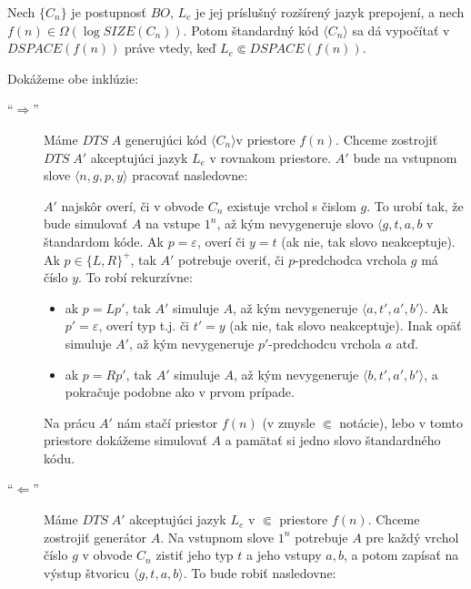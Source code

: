 {\begin{lema}
  Nech $\{ C_n\}$ je postupnosť $BO$, $L_e$ je jej príslušný
  rozšírený jazyk prepojení, a nech $f(n)\in\Omega(\log SIZE(C_n))$.
  Potom štandardný kód $\langle C_n\rangle$ sa dá vypočítať v
  $DSPACE(f(n))$ práve vtedy, keď $L_e\Subset DSPACE(f(n))$.
\end{lema}

\begin{dokaz}
  Dokážeme obe inklúzie:
  \begin{description}
    \item[``$\Rightarrow$''] Máme $DTS\; A$ generujúci kód $\langle
    C_n\rangle$v priestore $f(n)$. Chceme zostrojiť $DTS\; A'$
    akceptujúci jazyk $L_e$ v rovnakom priestore. $A'$ bude na
    vstupnom slove $\langle n,g,p,y\rangle$ pracovať nasledovne:

    $A'$ najskôr overí, či v obvode $C_n$ existuje vrchol s čislom
    $g$. To urobí tak, že bude simulovať $A$ na vstupe $1^n$, až kým
    nevygeneruje slovo $\langle g,t,a,b$ v štandardom kóde. Ak
    $p=\varepsilon$, overí či $y=t$ (ak nie, tak slovo neakceptuje).
    Ak $p\in\{ L,R\}^+$, tak $A'$ potrebuje overiť, či
    $p$-predchodca vrchola $g$ má číslo $y$. To robí rekurzívne:
    \begin{itemize}
      \item ak $p=Lp'$, tak $A'$ simuluje $A$, až kým nevygeneruje
      $\langle a,t',a',b'\rangle$. Ak $p'=\varepsilon$, overí typ t.j.
      či $t'=y$ (ak nie, tak slovo neakceptuje). Inak opäť simuluje
      $A'$, až kým nevygeneruje $p'$-predchodcu vrchola $a$ atď.
      \item ak $p=Rp'$, tak $A'$ simuluje $A$, až kým
      nevygeneruje $\langle b,t',a',b'\rangle$, a pokračuje podobne
      ako v prvom prípade.
    \end{itemize}
    Na prácu $A'$ nám stačí priestor $f(n)$ (v zmysle $\Subset$ notácie),
    lebo v tomto priestore dokážeme simulovať $A$ a pamätať si jedno
    slovo štandardného kódu.
    \item[``$\Leftarrow$''] Máme $DTS\;A'$ akceptujúci jazyk $L_e$ v
    $\Subset$ priestore $f(n)$. Chceme zostrojiť generátor $A$. Na
    vstupnom slove $1^n$ potrebuje $A$ pre každý vrchol číslo $g$ v
    obvode $C_n$ zistiť jeho typ $t$ a jeho vstupy $a,b$, a potom
    zapísať na výstup štvoricu $\langle g,t,a,b\rangle$. To bude
    robiť nasledovne:


\end{description}
\end{dokaz}}
